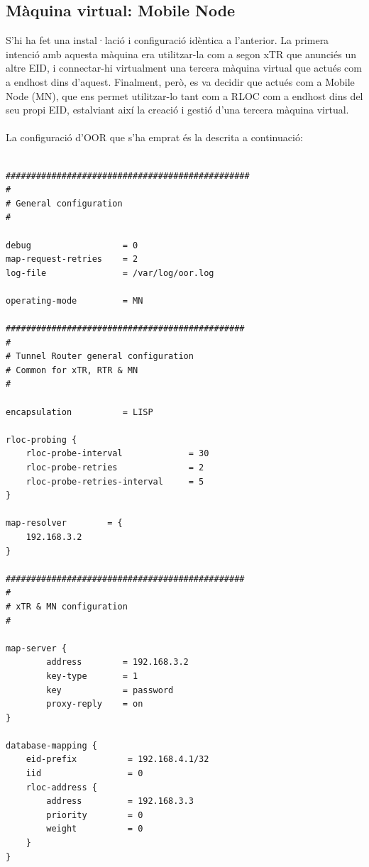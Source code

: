 \documentclass[11pt]{article}
\begin{document}
\subsection{Màquina virtual: Mobile Node}
S’hi ha fet una instal·lació i configuració idèntica a l’anterior. La primera intenció amb aquesta màquina era utilitzar-la com a segon xTR que anunciés un altre EID, i connectar-hi virtualment una tercera màquina virtual que actués com a endhost dins d’aquest. Finalment, però, es va decidir que actués com a Mobile Node (MN), que ens permet utilitzar-lo tant com a RLOC com a endhost dins del seu propi EID, estalviant així la creació i gestió d’una tercera màquina virtual.\\
\\
La configuració d’OOR que s’ha emprat és la descrita a continuació:\\
\lstset{caption=Configuració d'OOR del Mobile Node}
\begin{lstlisting}[frame=single]

################################################
#
# General configuration
#

debug                  = 0 
map-request-retries    = 2
log-file               = /var/log/oor.log
 
operating-mode         = MN

###############################################
#
# Tunnel Router general configuration
# Common for xTR, RTR & MN
#

encapsulation          = LISP

rloc-probing {
    rloc-probe-interval             = 30
    rloc-probe-retries              = 2
    rloc-probe-retries-interval     = 5
}

map-resolver        = {
	192.168.3.2
}

###############################################
#
# xTR & MN configuration
#

map-server {
        address        = 192.168.3.2
        key-type       = 1
        key            = password
        proxy-reply    = on
}

database-mapping {
    eid-prefix          = 192.168.4.1/32
    iid                 = 0
    rloc-address {
        address         = 192.168.3.3
        priority        = 0
        weight          = 0
    }
}

\end{lstlisting}
\end{document}

